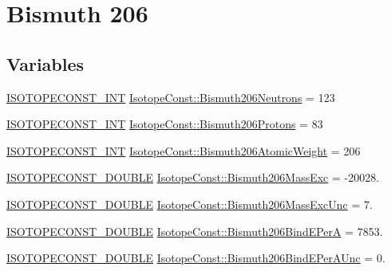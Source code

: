 \hypertarget{group___isotope_const-_bismuth-_bi206}{}\section{Bismuth 206}
\label{group___isotope_const-_bismuth-_bi206}
\subsection*{Variables}
\begin{DoxyCompactItemize}
\item 
\mbox{\hyperlink{group___isotope_const-_macros_ga5f18360b3e99483a35c32d789e62621c}{I\+S\+O\+T\+O\+P\+E\+C\+O\+N\+S\+T\+\_\+\+I\+NT}} \mbox{\hyperlink{group___isotope_const-_bismuth-_bi206_ga9a07a3210ca34b8e79524b80b3cf9d11}{Isotope\+Const\+::\+Bismuth206\+Neutrons}} = 123
\item 
\mbox{\hyperlink{group___isotope_const-_macros_ga5f18360b3e99483a35c32d789e62621c}{I\+S\+O\+T\+O\+P\+E\+C\+O\+N\+S\+T\+\_\+\+I\+NT}} \mbox{\hyperlink{group___isotope_const-_bismuth-_bi206_gaca7035d60652ba53af3c360c336fa1a3}{Isotope\+Const\+::\+Bismuth206\+Protons}} = 83
\item 
\mbox{\hyperlink{group___isotope_const-_macros_ga5f18360b3e99483a35c32d789e62621c}{I\+S\+O\+T\+O\+P\+E\+C\+O\+N\+S\+T\+\_\+\+I\+NT}} \mbox{\hyperlink{group___isotope_const-_bismuth-_bi206_gad795d53096260f0aa25bb3030b90d2d6}{Isotope\+Const\+::\+Bismuth206\+Atomic\+Weight}} = 206
\item 
\mbox{\hyperlink{group___isotope_const-_macros_ga8f45a7272ce02c0b4c65c44636ed719a}{I\+S\+O\+T\+O\+P\+E\+C\+O\+N\+S\+T\+\_\+\+D\+O\+U\+B\+LE}} \mbox{\hyperlink{group___isotope_const-_bismuth-_bi206_gaa13318a3f92a10a85bcd072303501547}{Isotope\+Const\+::\+Bismuth206\+Mass\+Exc}} = -\/20028.
\item 
\mbox{\hyperlink{group___isotope_const-_macros_ga8f45a7272ce02c0b4c65c44636ed719a}{I\+S\+O\+T\+O\+P\+E\+C\+O\+N\+S\+T\+\_\+\+D\+O\+U\+B\+LE}} \mbox{\hyperlink{group___isotope_const-_bismuth-_bi206_ga78bd42636b191855aeb1184be1dd394d}{Isotope\+Const\+::\+Bismuth206\+Mass\+Exc\+Unc}} = 7.
\item 
\mbox{\hyperlink{group___isotope_const-_macros_ga8f45a7272ce02c0b4c65c44636ed719a}{I\+S\+O\+T\+O\+P\+E\+C\+O\+N\+S\+T\+\_\+\+D\+O\+U\+B\+LE}} \mbox{\hyperlink{group___isotope_const-_bismuth-_bi206_ga3d1e5a7a8cf3d40f5102e0abe3fd263f}{Isotope\+Const\+::\+Bismuth206\+Bind\+E\+PerA}} = 7853.
\item 
\mbox{\hyperlink{group___isotope_const-_macros_ga8f45a7272ce02c0b4c65c44636ed719a}{I\+S\+O\+T\+O\+P\+E\+C\+O\+N\+S\+T\+\_\+\+D\+O\+U\+B\+LE}} \mbox{\hyperlink{group___isotope_const-_bismuth-_bi206_ga6eb04ca817e9c26067992e4458525a8e}{Isotope\+Const\+::\+Bismuth206\+Bind\+E\+Per\+A\+Unc}} = 0.

\end{DoxyCompactItemize}
